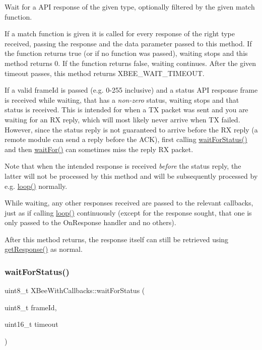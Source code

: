 Wait for a A\+PI response of the given type, optionally filtered by the given match function.

If a match function is given it is called for every response of the right type received, passing the response and the data parameter passed to this method. If the function returns true (or if no function was passed), waiting stops and this method returns 0. If the function returns false, waiting continues. After the given timeout passes, this method returns X\+B\+E\+E\+\_\+\+W\+A\+I\+T\+\_\+\+T\+I\+M\+E\+O\+UT.

If a valid frame\+Id is passed (e.\+g. 0-\/255 inclusive) and a status A\+PI response frame is received while waiting, that has a {\itshape non-\/zero} status, waiting stops and that status is received. This is intended for when a TX packet was sent and you are waiting for an RX reply, which will most likely never arrive when TX failed. However, since the status reply is not guaranteed to arrive before the RX reply (a remote module can send a reply before the A\+CK), first calling \hyperlink{class_x_bee_with_callbacks_acc987ba525278080c3cbe2db1d2ed249}{wait\+For\+Status()} and then \hyperlink{class_x_bee_with_callbacks_aca6a7f82b94c3d2dc4353c0a18404da7}{wait\+For()} can sometimes miss the reply RX packet.

Note that when the intended response is received {\itshape before} the status reply, the latter will not be processed by this method and will be subsequently processed by e.\+g. \hyperlink{class_x_bee_with_callbacks_aec6a4688f09fef714c377ede587b5ba9}{loop()} normally.

While waiting, any other responses received are passed to the relevant callbacks, just as if calling \hyperlink{class_x_bee_with_callbacks_aec6a4688f09fef714c377ede587b5ba9}{loop()} continuously (except for the response sought, that one is only passed to the On\+Response handler and no others).

After this method returns, the response itself can still be retrieved using \hyperlink{class_x_bee_a18250def80e8b643aa1ccc15a98937f3}{get\+Response()} as normal. \hypertarget{class_x_bee_with_callbacks_acc987ba525278080c3cbe2db1d2ed249}{}\label{class_x_bee_with_callbacks_acc987ba525278080c3cbe2db1d2ed249} 
\subsubsection{\texorpdfstring{wait\+For\+Status()}{waitForStatus()}}
{\footnotesize\ttfamily uint8\+\_\+t X\+Bee\+With\+Callbacks\+::wait\+For\+Status (\begin{DoxyParamCaption}\item[{uint8\+\_\+t}]{frame\+Id,  }\item[{uint16\+\_\+t}]{timeout }\end{DoxyParamCaption})}

